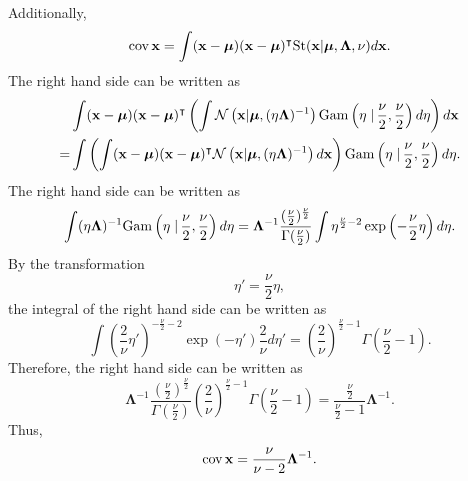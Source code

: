 Additionally,
%
\begin{equation}
\operatorname{cov} \mathbf{x}
=
\int
(\mathbf{x} - \bm{\mu})
(\mathbf{x} - \bm{\mu}) ^ \intercal
{\rm St} (\mathbf{x} | \bm{\mu}, \bm{\Lambda}, \nu)
d\mathbf{x}.
\end{equation}
%
The right hand side can be written as
%
\begin{equation}
\begin{aligned}
&
\int
(\mathbf{x} - \bm{\mu})
(\mathbf{x} - \bm{\mu}) ^ \intercal
\left(
	\int
	\mathcal{N} 
	\left(
		\mathbf{x} 
		| 
		\bm{\mu}, 
		(\eta \bm{\Lambda}) ^ {- 1}
	\right)
	{\rm Gam} 
	\left(
		\eta 
		\left.
		\right \vert
		\frac{\nu}{2}, 
		\frac{\nu}{2}
	\right)
	d\eta
\right)
d\mathbf{x} 
\\
=&
\int
\left(
	\int
	(\mathbf{x} - \bm{\mu})
	(\mathbf{x} - \bm{\mu}) ^ \intercal
	\mathcal{N} 
	\left(
		\mathbf{x} 
		| 
		\bm{\mu}, 
		(\eta \bm{\Lambda}) ^ {- 1}
	\right)
	d\mathbf{x}
\right)
{\rm Gam} 
	\left(
		\eta 
		\left.
		\right \vert
		\frac{\nu}{2}, 
		\frac{\nu}{2}
	\right)
d\eta.
\end{aligned}
\end{equation}
%
The right hand side can be written as
%
\begin{equation}
\int
(\eta \bm{\Lambda}) ^ {- 1}
{\rm Gam} 
	\left(
		\eta 
		\left.
		\right \vert
		\frac{\nu}{2}, 
		\frac{\nu}{2}
	\right)
d\eta
=
\bm{\Lambda} ^ {- 1}
\frac{(\frac{\nu}{2}) ^ \frac{\nu}{2}}{\Gamma(\frac{\nu}{2})}
\int
\eta ^ {\frac{\nu}{2} - 2}
\exp
\left(
	-
	\frac{\nu}{2}
	\eta
\right)
d\eta.
\end{equation}
%
By the transformation
%
\begin{equation}
\eta'
=
\frac{\nu}{2}
\eta,
\end{equation}
%
the integral of the right hand side can be written as
%
\begin{equation}
\int
\left(
	\frac{2}{\nu}
	\eta'
\right) ^ {- \frac{\nu}{2} - 2}
\exp(- \eta')
\frac{2}{\nu}
d\eta'
=
\left(
	\frac{2}{\nu}
\right) ^ {\frac{\nu}{2} - 1}
\Gamma
\left(
	\frac{\nu}{2}
	-
	1
\right).
\end{equation}
%
Therefore, the right hand side can be written as
%
\begin{equation}
\bm{\Lambda} ^ {- 1}
\frac{(\frac{\nu}{2}) ^ \frac{\nu}{2}}{\Gamma(\frac{\nu}{2})}
\left(
	\frac{2}{\nu}
\right) ^ {\frac{\nu}{2} - 1}
\Gamma
\left(
	\frac{\nu}{2}
	-
	1
\right)
=
\frac
{\frac{\nu}{2}}
{\frac{\nu}{2} - 1}
\bm{\Lambda} ^ {- 1}.
\end{equation}
%
Thus,
%
\begin{equation}
\operatorname{cov} \mathbf{x}
=
\frac{\nu}{\nu - 2} \bm{\Lambda} ^ {- 1}.
\end{equation}
%

